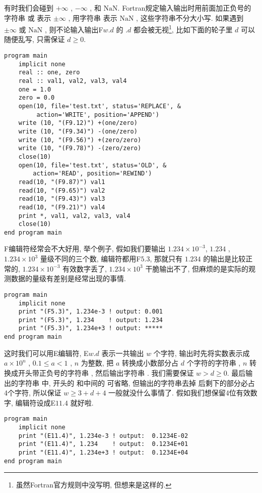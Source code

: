 有时我们会碰到  $ +\infty $ , $ -\infty $ , 和 $ \text{NaN} $. Fortran规定输入输出时用前面加正负号的字符串  或  表示 $ \pm\infty $ , 用字符串  表示 $ \text{NaN} $ , 这些字符串不分大小写. 如果遇到 $ \pm\infty $ 或 $ \text{NaN} $ , 则不论输入输出F$ w. d $ 的 $. d $ 都会被无视\footnote{虽然Fortran官方规则中没写明, 但想来是这样的.\label{edit_IEEE}}, 比如下面的轮子里 $ d $ 可以随便乱写, 只需保证 $ d\geqslant0 $. 
\begin{lstlisting}
program main
    implicit none
    real :: one, zero
    real :: val1, val2, val3, val4
    one = 1.0
    zero = 0.0
    open(10, file='test.txt', status='REPLACE', &
         action='WRITE', position='APPEND')
    write (10, "(F9.12)") +(one/zero)
    write (10, "(F9.34)") -(one/zero)
    write (10, "(F9.56)") +(zero/zero)
    write (10, "(F9.78)") -(zero/zero)
    close(10)
    open(10, file='test.txt', status='OLD', &
        action='READ', position='REWIND')
    read(10, "(F9.87)") val1
    read(10, "(F9.65)") val2
    read(10, "(F9.43)") val3
    read(10, "(F9.21)") val4
    print *, val1, val2, val3, val4
    close(10)
end program main
\end{lstlisting}

F编辑符经常会不大好用, 举个例子, 假如我们要输出 $ 1.234\times10^{-3}  $, $ 1.234 $ , $ 1.234\times10^{3}  $ 量级不同的三个数, 编辑符都用F$ 5.3 $, 那就只有 $ 1.234 $ 的输出是比较正常的, $ 1.234\times10^{-3}  $ 有效数字丢了, $ 1.234\times10^{3}  $ 干脆输出不了, 但麻烦的是实际的观测数据的量级有差别是经常出现的事情. 
\begin{lstlisting}
program main
    implicit none
    print "(F5.3)", 1.234e-3 ! output: 0.001
    print "(F5.3)", 1.234    ! output: 1.234
    print "(F5.3)", 1.234e+3 ! output: *****
end program main
\end{lstlisting}
这时我们可以用E编辑符, E$ w. d $ 表示一共输出 $ w $ 个字符, 输出时先将实数表示成 $ a\times10^{n} $ , $ 0.1\leqslant a<1 $ , $ n $ 为整数, 把 $ a $ 转换成小数部分占 $ d $ 个字符的字符串 , $ n $ 转换成开头带正负号的字符串 , 然后输出字符串 . 我们需要保证 $ w>d\geqslant0 $. 最后输出的字符串  中, 开头的  和中间的  可省略, 但输出的字符串去掉  后剩下的部分必占4个字符, 所以保证 $ w\geqslant 3+d+4 $ 一般就没什么事情了. 假如我们想保留4位有效数字, 编辑符设成E$ 11.4 $ 就好啦. 
\begin{lstlisting}
program main
    implicit none
    print "(E11.4)", 1.234e-3 ! output:  0.1234E-02
    print "(E11.4)", 1.234    ! output:  0.1234E+01
    print "(E11.4)", 1.234e+3 ! output:  0.1234E+04
end program main
\end{lstlisting}

